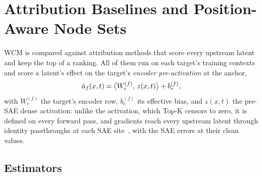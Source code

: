 \documentclass[10pt]{article}
\begin{document}
\section{Attribution Baselines and Position-Aware Node Sets}
\label{app:attribution}
\label{sec:attr-baselines}
WCM is compared against attribution methods that score every upstream latent and keep the top of a ranking.
All of them run on each target's training contexts and score a latent's effect on the target's \emph{encoder pre-activation} at the anchor,
\[
    \hat{a}_f(x, t)
    = \bigl\langle W_e^{(f)},\, z(x, t) \bigr\rangle + b_e^{(f)},
\]
with $W_e^{(f)}$ the target's encoder row, $b_e^{(f)}$ its effective bias, and $z(x, t)$ the pre-SAE dense activation: unlike the activation, which Top-K censors to zero, it is defined on every forward pass, and gradients reach every upstream latent through identity passthroughs at each SAE site~\citep{marks2025sparse}, with the SAE errors at their clean values.

\subsection{Estimators}
\end{document}
